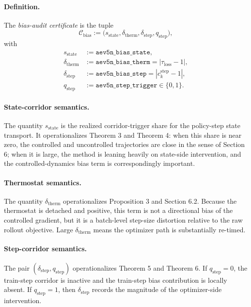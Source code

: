 \documentclass[11pt]{article}
\newcommand{\1}{\mathbf{1}}
\newcommand{\abs}[1]{\left\lvert #1 \right\rvert}
\begin{document}
\paragraph{Definition.}
The \emph{bias-audit certificate} is the tuple
\begin{equation}
  \mathcal{C}_{\mathrm{bias}}
  :=
  \big(
    s_{\mathrm{state}},
    \delta_{\mathrm{therm}},
    \delta_{\mathrm{step}},
    q_{\mathrm{step}}
  \big),
\end{equation}
with
\begin{align}
  s_{\mathrm{state}} &:= \texttt{aev5n\_bias\_state},\\
  \delta_{\mathrm{therm}} &:= \texttt{aev5n\_bias\_therm} = \abs{\tau_{\mathrm{loss}}-1},\\
  \delta_{\mathrm{step}} &:= \texttt{aev5n\_bias\_step} = \abs{c_k^{\mathrm{step}}-1},\\
  q_{\mathrm{step}} &:= \texttt{aev5n\_step\_trigger}\in\{0,1\}.
\end{align}

\paragraph{State-corridor semantics.}
The quantity $s_{\mathrm{state}}$ is the realized corridor-trigger share for the policy-step state transport. It operationalizes Theorem 3 and Theorem 4: when this share is near zero, the controlled and uncontrolled trajectories are close in the sense of Section 6; when it is large, the method is leaning heavily on state-side intervention, and the controlled-dynamics bias term is correspondingly important.

\paragraph{Thermostat semantics.}
The quantity $\delta_{\mathrm{therm}}$ operationalizes Proposition 3 and Section 6.2. Because the thermostat is detached and positive, this term is not a directional bias of the controlled gradient, but it is a batch-level step-size distortion relative to the raw rollout objective. Large $\delta_{\mathrm{therm}}$ means the optimizer path is substantially re-timed.

\paragraph{Step-corridor semantics.}
The pair $(\delta_{\mathrm{step}}, q_{\mathrm{step}})$ operationalizes Theorem 5 and Theorem 6. If $q_{\mathrm{step}}=0$, the train-step corridor is inactive and the train-step bias contribution is locally absent. If $q_{\mathrm{step}}=1$, then $\delta_{\mathrm{step}}$ records the magnitude of the optimizer-side intervention.
\end{document}
